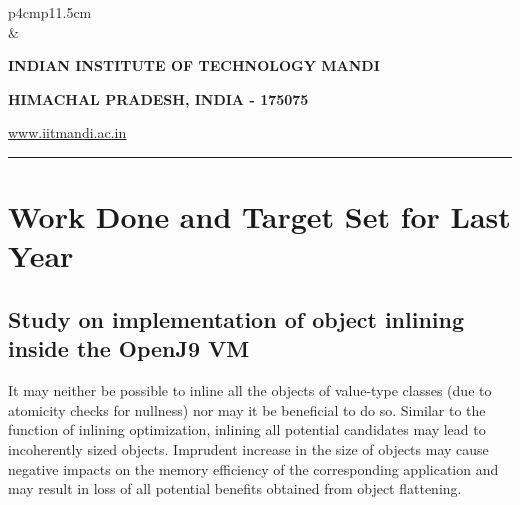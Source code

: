 \documentclass[12 pt, a4paper]{article}
\newcommand{\HRule}{\rule{\linewidth}{1mm}}
\begin{document}
\clearpage

\pagestyle{empty}
\vskip 0.2cm
	\begin{tabular}{p{4cm}p{11.5cm}}
		  \\
		& \centering \large\bf\phantom{Empty line}\\ 
		\rule{0pt}{1pt} \centering \large\bf{INDIAN INSTITUTE OF TECHNOLOGY MANDI} \\
		\rule{0pt}{1pt} \centering \large\bf{HIMACHAL PRADESH, INDIA - 175075} \\
		\rule{0pt}{1pt} \centering \underline{\href{www.iitmandi.ac.in}{www.iitmandi.ac.in}}\\
	\end{tabular}
\noindent

{\raggedleft{}\HRule}

\section{Work Done and Target Set for Last Year}

\subsection{Study on implementation of object inlining inside the OpenJ9 VM}
\label{subsec:Subsection1}
It may neither be possible to inline all the objects of value-type classes (due to atomicity checks for 
nullness) nor may it be beneficial to do so.
Similar to the function of inlining optimization, inlining all potential candidates 
may lead to incoherently sized objects.
Imprudent increase in the size of objects may cause negative impacts on the memory efficiency of the 
corresponding application and may result 
in loss of all potential benefits obtained from object flattening. 
\end{document}

